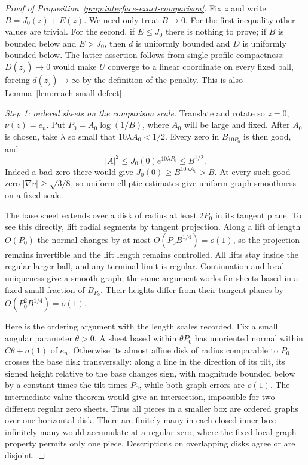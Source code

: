 \begin{proof}[Proof of Proposition~\ref{prop:interface-exact-comparison}]
Fix $z$ and write $B=J_0(z)+E(z)$.  We need only treat $B\to0$.
For the first inequality other values are trivial.  For the second,
if $E\le J_0$ there is nothing to prove; if $B$ is bounded below and
$E>J_0$, then $d$ is uniformly bounded and $D$ is uniformly bounded
below.  The latter assertion follows from single-profile compactness:
$D(z_j)\to0$ would make $U$ converge to a linear coordinate on every
fixed ball, forcing $d(z_j)\to\infty$ by the definition of the penalty.
This is also Lemma~\ref{lem:reach-small-defect}.

\emph{Step 1: ordered sheets on the comparison scale.}
Translate and rotate so $z=0$, $\nu(z)=e_n$.  Put
$P_0=A_0\log(1/B)$, where $A_0$ will be large and fixed.
After $A_0$ is chosen, take $\lambda$ so small that
$10\lambda A_0<1/2$.  Every zero in $B_{10P_0}$ is then good, and
\[
 |A|^2\le J_0(0)e^{10\lambda P_0}\le B^{1/2}.
\]
Indeed a bad zero there would give $J_0(0)\ge B^{10\lambda A_0}>B$.
At every such good zero $|\nabla v|\ge\sqrt{3/8}$, so uniform
elliptic estimates give uniform graph smoothness on a fixed scale.

The base sheet extends over a disk of radius at least $2P_0$ in its
tangent plane.  To see this directly, lift radial segments by tangent
projection.  Along a lift of length $O(P_0)$ the normal changes by
at most $O(P_0B^{1/4})=o(1)$, so the projection remains invertible
and the lift length remains controlled.  All lifts stay inside the
regular larger ball, and any terminal limit is regular.  Continuation
and local uniqueness give a smooth graph; the same argument works
for sheets based in a fixed small fraction of $B_{P_0}$.  Their
heights differ from their tangent planes by $O(P_0^2B^{1/4})=o(1)$.

Here is the ordering argument with the length scales recorded.
Fix a small angular parameter $\theta>0$.  A sheet based within
$\theta P_0$ has unoriented normal within $C\theta+o(1)$ of $e_n$.
Otherwise its almost affine disk of radius comparable to $P_0$
crosses the base disk transversally: along a line in the direction
of its tilt, its signed height relative to the base changes sign,
with magnitude bounded below by a constant times the tilt times
$P_0$, while both graph errors are $o(1)$.  The intermediate value
theorem would give an intersection, impossible for two different
regular zero sheets.  Thus all pieces in a smaller box are ordered
graphs over one horizontal disk.  There are finitely many in each
closed inner box: infinitely many would accumulate at a regular zero,
where the fixed local graph property permits only one piece.
Descriptions on overlapping disks agree or are disjoint.


\end{proof}
